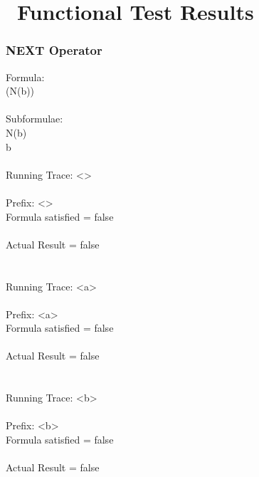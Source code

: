 \chapter{\RH\ Functional Test Results}
\label{app:RHFunctionalTestResults}

\subsection{NEXT Operator}

Formula:\\
(N(b))\\
\\
Subformulae:\\
N(b)\\
b\\
\\
Running Trace: \textless \textgreater\\
\\
  Prefix: \textless \textgreater\\
  Formula satisfied = false\\
\\
  Actual Result = false\\
\\
\\
Running Trace: \textless a\textgreater\\
\\
  Prefix: \textless a\textgreater\\
  Formula satisfied = false\\
\\
  Actual Result = false\\
\\
\\
Running Trace: \textless b\textgreater\\
\\
  Prefix: \textless b\textgreater\\
  Formula satisfied = false\\
\\
  Actual Result = false\\

\newpage

